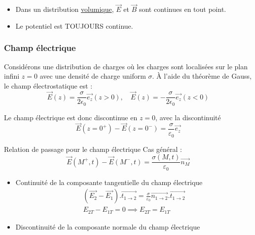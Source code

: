 \begin{itemize}

    \item 
Dans un distribution \underline{volumique}, $\overrightarrow{E}$ et $\overrightarrow{B}$ sont continues en tout point.

\item Le potentiel est TOUJOURS continue.

\end{itemize}

\subsubsection{Champ électrique} %
\label{sec:Champ électrique}

Considérons une distribution de charges où les charges sont localisées sur le plan infini $z=0$ avec une densité de charge uniform $\sigma$. À l'aide du théorème de Gauss, le champ électrostatique est : 
\begin{equation}
  \overrightarrow{E} (z) = \frac{\sigma}{2\epsilon_0}  \overrightarrow{e_z} (z>0),
  \quad\overrightarrow{E} (z) = -\frac{\sigma}{2\epsilon_0}  \overrightarrow{e_z} (z<0)
\end{equation}

Le champ électrique est donc discontinue en $z=0$, avec la discontinuité 
\begin{equation}
  \overrightarrow{E}(z= 0 ^{+}) - \overrightarrow{E} ( z= 0 ^{-}) = \frac{\sigma}{\varepsilon_0}  \overrightarrow{e_z}
\end{equation}

\begin{Prop}[colbacktitle=red!75!black]{Relation de passage pour le champ électrique}{}
  Cas général :
\begin{equation}
  \overrightarrow{E}(M ^{+}, t) - \overrightarrow{E}(M ^{-},t) = \frac{\sigma(M,t)}{\varepsilon_0}  \overrightarrow{n_M}
\end{equation}
\end{Prop}

\begin{itemize}

    \item Continuité de la composante tangentielle du champ électrique 
\begin{gather}
(\overrightarrow{E_2} - \overrightarrow{E_1}) . \overrightarrow{t _{1 \to 2}}  = \frac{\sigma}{\varepsilon_0}  \overrightarrow{n _{1 \to 2}} . \overrightarrow{t _{1 \to 2}} \\ 
E _{2T} - E_{1T} = 0 \implies E _{2T} = E _{1T}
\end{gather}
    \item Discontinuité de la composante normale du champ électrique

\end{itemize}


